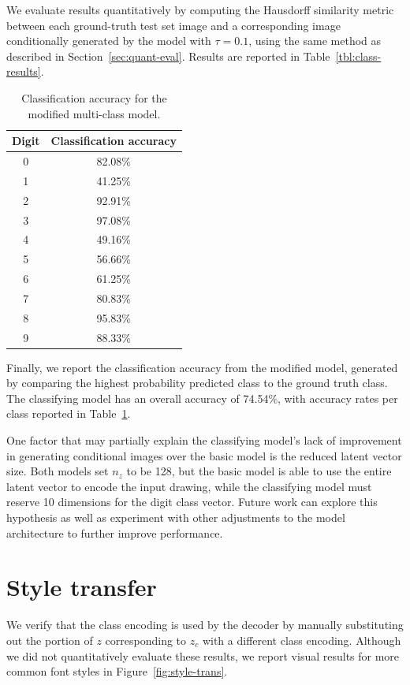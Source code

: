 We evaluate results quantitatively by computing the Hausdorff similarity metric between each ground-truth test set image and a corresponding image conditionally generated by the model with $\tau = 0.1$, using the same method as described in Section~\ref{sec:quant-eval}. Results are reported in Table~\ref{tbl:class-results}.

\begin{table}[h]
\centering
\caption[Classification accuracy for the modified multi-class model]
    {Classification accuracy for the modified multi-class model.\label{tbl:class-acc}}
\begin{tabular}{c c}
\toprule
    Digit & Classification accuracy \\ \midrule
    0 & 82.08\% \\
    1 & 41.25\% \\
    2 & 92.91\% \\
    3 & 97.08\% \\
    4 & 49.16\% \\
    5 & 56.66\% \\
    6 & 61.25\% \\
    7 & 80.83\% \\
    8 & 95.83\% \\
    9 & 88.33\%
\end{tabular}
\end{table}

Finally, we report the classification accuracy from the modified model, generated by comparing the highest probability predicted class to the ground truth class. The classifying model has an overall accuracy of 74.54\%, with accuracy rates per class reported in Table~\ref{tbl:class-acc}.

One factor that may partially explain the classifying model's lack of improvement in generating conditional images over the basic model is the reduced latent vector size.
Both models set $n_z$ to be 128, but the basic model is able to use the entire latent vector to encode the input drawing, while the classifying model must reserve 10 dimensions for the digit class vector.
Future work can explore this hypothesis as well as experiment with other adjustments to the model architecture to further improve performance.

\section{Style transfer}
We verify that the class encoding is used by the decoder by manually substituting out the portion of $z$ corresponding to $z_c$ with a different class encoding.
Although we did not quantitatively evaluate these results, we report visual results for more common font styles in Figure~\ref{fig:style-trans}. 

